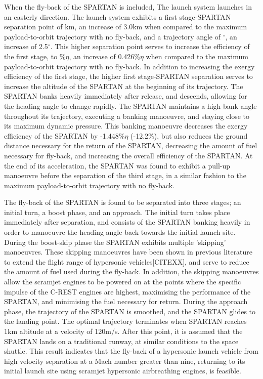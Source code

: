 When the fly-back of the SPARTAN is included, The launch system launches in an easterly direction. 
The launch system exhibits a first stage-SPARTAN separation point of \firstsecondSeparationAltStandard km, an increase of 3.0km when compared to the maximum payload-to-orbit trajectory with no fly-back, and a trajectory angle of \firstsecondSeparationgammaStandard $^\circ$, an increase of 2.5$^\circ$. 
This higher separation point serves to increase the efficiency of the first stage, to \firstExergyEffStandard \%$\eta$, an increase of 0.426\%$\eta$ when compared to the maximum payload-to-orbit trajectory with no fly-back.
In addition to increasing the exergy efficiency of the first stage, the higher first stage-SPARTAN separation serves to increase the altitude of the SPARTAN at the beginning of its trajectory. The SPARTAN banks heavily immediately after release, and descends, allowing for the heading angle to change rapidly. The SPARTAN maintains a high bank angle throughout its trajectory, executing a banking manoeuvre, and staying close to its maximum dynamic pressure. 
This banking manoeuvre decreases the exergy efficiency of the SPARTAN by -1.448\%$\eta$ (-12.2\%), but also reduces the ground distance necessary for the return of the SPARTAN, decreasing the amount of fuel necessary for fly-back, and increasing the overall efficiency of the SPARTAN. 
At the end of its acceleration, the SPARTAN was found to exhibit a pull-up manoeuvre before the separation of the third stage, in a similar fashion to the maximum payload-to-orbit trajectory with no fly-back. 

The fly-back of the SPARTAN is found to be separated into three stages; an initial turn, a boost phase, and an approach. 
The initial turn takes place immediately after separation, and consists of the SPARTAN banking heavily in order to manoeuvre the heading angle back towards the initial launch site. 
During the boost-skip phase the SPARTAN exhibits multiple 'skipping' manoeuvres. These skipping manoeuvres have been shown in previous literature to extend the flight range of hypersonic vehicles[CITEXX], and serve to reduce the amount of fuel used during the fly-back.
In addition, the skipping manoeuvres allow the scramjet engines to be powered on at the points where the specific impulse of the C-REST engines are highest, maximising the performance of the SPARTAN, and minimising the fuel necessary for return. 
During the approach phase, the trajectory of the SPARTAN is smoothed, and the SPARTAN glides to the landing point. 
 The optimal trajectory terminates when SPARTAN reaches 1km altitude at a velocity of 120m/s. After this point, it is assumed that the SPARTAN lands on a traditional runway, at similar conditions to the space shuttle.  
This result indicates that the fly-back of a hypersonic launch vehicle from high velocity separation at a Mach number greater than nine, returning to its initial launch site using scramjet hypersonic airbreathing engines, is feasible.  

